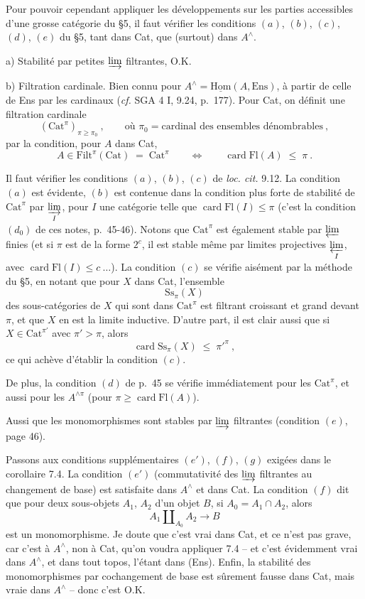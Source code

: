\documentclass[11pt]{article}
\newcommand{\printedpage}[1]{\marginpar{\raggedright\footnotesize p.~#1}}
\newcommand{\msp}[1]{\marginpar{\raggedright\footnotesize [#1]}}
\newcommand{\Fl}{\mathrm{Fl}}
\newcommand{\Cat}{\mathrm{Cat}}
\newcommand{\chap}{^{\wedge}}
\begin{document}
Pour pouvoir cependant appliquer les développements sur les parties accessibles d'une grosse catégorie du §5, il faut vérifier les conditions $(a)$, $(b)$, $(c)$, $(d)$, $(e)$ du §5, tant dans Cat, que (surtout) dans $A\chap$.

a) Stabilité par petites $\varinjlim$ filtrantes, O.K.

b) Filtration cardinale. Bien connu pour $A\chap = \underline{\mathrm{Hom}}(A,\mathrm{Ens})$, à partir de celle de Ens par les cardinaux (\textit{cf.} SGA 4 I, 9.24, p.~177). Pour Cat, on définit une filtration cardinale
\[
(\Cat^{\pi})_{\pi\geq\pi_0}\ , \qquad \text{où } \pi_0 = \text{cardinal des ensembles dénombrables}\ ,
\tag*{(8.3)}
\]
\printedpage{56}
\msp{page 101}
par la condition, pour $A$ dans Cat,
\[
A\in \mathrm{Filt}^{\pi}(\Cat) \;=\; \Cat^{\pi} \qquad\Longleftrightarrow\qquad \operatorname{card}\Fl(A) \;\leq\; \pi\ .
\tag*{(8.4)}
\]

Il faut vérifier les conditions $(a)$, $(b)$, $(c)$ de \textit{loc. cit.} 9.12. La condition $(a)$ est évidente, $(b)$ est contenue dans la condition plus forte de stabilité de $\Cat^{\pi}$ par $\varinjlim\limits_{I}$, pour $I$ une catégorie telle que $\operatorname{card}\Fl(I)\leq\pi$ (c'est la condition $(d_0)$ de ces notes, p.~45-46). Notons que $\Cat^{\pi}$ est également stable par $\varprojlim$ finies (et si $\pi$ est de la forme $2^c$, il est stable même par limites projectives $\varprojlim\limits_{I}$, avec $\operatorname{card}\Fl(I)\leq c\ \ldots$). La condition $(c)$ se vérifie aisément par la méthode du §5, en notant que pour $X$ dans Cat, l'ensemble
\[
\mathrm{Ss}_{\pi}(X)
\]
des sous-catégories de $X$ qui sont dans $\Cat^{\pi}$ est filtrant croissant et grand devant $\pi$, et que $X$ en est la limite inductive. D'autre part, il est clair aussi que si $X\in\Cat^{\pi'}$ avec $\pi'>\pi$, alors
\[
\operatorname{card}\mathrm{Ss}_{\pi}(X) \;\leq\; \pi'^{\pi}\ ,
\]
ce qui achève d'établir la condition $(c)$.

De plus, la condition $(d)$ de p.~45 se vérifie immédiatement pour les $\Cat^{\pi}$, et aussi pour les $A^{\wedge\pi}$ (pour $\pi\geq\operatorname{card}\Fl(A)$).

Aussi que les monomorphismes sont stables par $\varinjlim$ filtrantes (condition $(e)$, page 46).

\msp{page 102}
Passons aux conditions supplémentaires $(e')$, $(f)$, $(g)$ exigées dans le corollaire 7.4. La condition $(e')$ (commutativité des $\varinjlim$ filtrantes au changement de base) est satisfaite dans $A\chap$ et dans Cat. La condition $(f)$ dit que pour deux sous-objets $A_1$, $A_2$ d'un objet $B$, si $A_0=A_1\cap A_2$, alors
\[
A_1\amalg_{A_0}A_2 \longrightarrow B
\]
est un monomorphisme. Je doute que c'est vrai dans Cat, et ce n'est pas grave, car c'est à $A\chap$, non à Cat, qu'on voudra appliquer 7.4 -- et c'est évidemment vrai dans $A\chap$, et dans tout topos, l'étant dans (Ens). Enfin, la stabilité des monomorphismes par cochangement de base est sûrement fausse dans Cat, mais vraie dans $A\chap$ -- donc c'est O.K.
\end{document}
